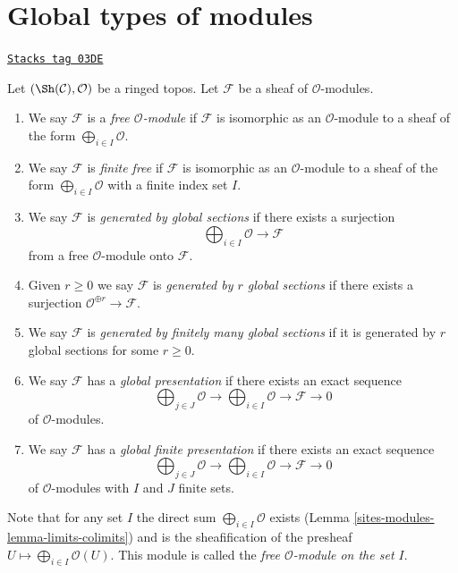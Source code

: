 \section{Global types of modules}
\label{sites-modules-section-global}
\begin{definition}[Global]
\label{sites-modules-definition-global}
\href{https://stacks.math.columbia.edu/tag/03DE}{\texttt{Stacks tag 03DE}}

Let $(\Sh(\mathcal{C}), \mathcal{O})$ be a ringed topos.
Let $\mathcal{F}$ be a sheaf of $\mathcal{O}$-modules.
\begin{enumerate}
\item We say $\mathcal{F}$ is a {\it free $\mathcal{O}$-module}
if $\mathcal{F}$ is isomorphic as an $\mathcal{O}$-module
to a sheaf of the form $\bigoplus_{i \in I} \mathcal{O}$.
\item We say $\mathcal{F}$ is {\it finite free} if
$\mathcal{F}$ is isomorphic as an $\mathcal{O}$-module
to a sheaf of the form $\bigoplus_{i \in I} \mathcal{O}$
with a finite index set $I$.
\item We say $\mathcal{F}$ is {\it generated by global sections}
if there exists a surjection
$$
\bigoplus\nolimits_{i \in I} \mathcal{O} \longrightarrow \mathcal{F}
$$
from a free $\mathcal{O}$-module onto $\mathcal{F}$.
\item Given $r \geq 0$ we say $\mathcal{F}$ is
{\it generated by $r$ global sections} if there exists a surjection
$\mathcal{O}^{\oplus r} \to \mathcal{F}$.
\item We say $\mathcal{F}$ is {\it generated by finitely many global sections}
if it is generated by $r$ global sections for some $r \geq 0$.
\item We say $\mathcal{F}$ has a {\it global presentation}
if there exists an exact sequence
$$
\bigoplus\nolimits_{j \in J} \mathcal{O} \longrightarrow
\bigoplus\nolimits_{i \in I} \mathcal{O} \longrightarrow
\mathcal{F} \longrightarrow 0
$$
of $\mathcal{O}$-modules.
\item We say $\mathcal{F}$ has a {\it global finite presentation}
if there exists an exact sequence
$$
\bigoplus\nolimits_{j \in J} \mathcal{O} \longrightarrow
\bigoplus\nolimits_{i \in I} \mathcal{O} \longrightarrow
\mathcal{F} \longrightarrow 0
$$
of $\mathcal{O}$-modules with $I$ and $J$ finite sets.
\end{enumerate}
\end{definition}

Note that for any set $I$ the direct sum
$\bigoplus_{i \in I} \mathcal{O}$ exists
(Lemma \ref{sites-modules-lemma-limits-colimits})
and is the sheafification of the presheaf
$U \mapsto \bigoplus_{i \in I} \mathcal{O}(U)$.
This module is called the {\it free $\mathcal{O}$-module on the set $I$}.

